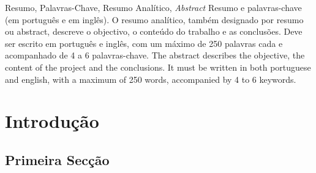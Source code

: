 \documentclass[portuguese]{ist-thesis}
\begin{document}
\makecover

\begin{dedication}
	\lipsum[1] %
\end{dedication}

\begin{acknowledgements}
	\lipsum[2] %
\end{acknowledgements}

\begin{tabstract}{Resumo, Palavras-Chave, Resumo Analítico, \textit{Abstract}}
	Resumo e palavras-chave (em português e em inglês). O resumo analítico, também designado por resumo ou abstract, descreve o objectivo, o conteúdo do trabalho e as conclusões. Deve ser escrito em português e inglês, com um máximo de 250 palavras cada e acompanhado de 4 a 6 palavras-chave.
	The abstract describes the objective, the content of the project and the conclusions. It must be written in both portuguese and english, with a maximum of 250 words, accompanied by 4 to 6 keywords.
\end{tabstract}

\tableofcontents

\listoffigures

\listoftables

\mainstart

\chapter{Introdução}

\lipsum[1] %

\section{Primeira Secção}
\end{document}

